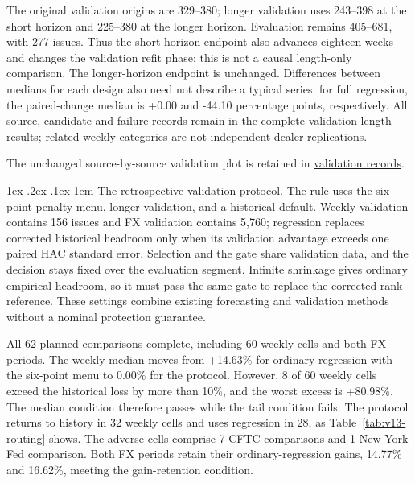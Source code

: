 \documentclass[12pt,a4paper]{article}
\makeatletter
\renewcommand\paragraph{\@startsection{paragraph}{4}{\z@}%
  {1ex \@plus .2ex \@minus .1ex}{-1em}%
  {\normalfont\normalsize\bfseries}}
\makeatother
\begin{document}
The original validation origins are 329--380; longer validation uses 243--398 at the short horizon and 225--380 at the longer horizon. Evaluation remains 405--681, with 277 issues. Thus the short-horizon endpoint also advances eighteen weeks and changes the validation refit phase; this is not a causal length-only comparison. The longer-horizon endpoint is unchanged. Differences between medians for each design also need not describe a typical series: for full regression, the paired-change median is +0.00 and -44.10 percentage points, respectively. All source, candidate and failure records remain in the \href{https://github.com/ByronLi0207/financial-mathematics-paper-20261020/tree/revision-v13/results/v13/nyfed-validation}{complete validation-length results}; related weekly categories are not independent dealer replications.

The unchanged source-by-source validation plot is retained in \href{https://github.com/ByronLi0207/financial-mathematics-paper-20261020/blob/submission-final/EXTENDED_RESULTS.md#asmbi-extended-s38}{validation records}.


\FloatBarrier
\paragraph{The retrospective validation protocol.}
The rule uses the six-point penalty menu, longer validation, and a historical default. Weekly validation contains 156 issues and FX validation contains 5,760; regression replaces corrected historical headroom only when its validation advantage exceeds one paired HAC standard error. Selection and the gate share validation data, and the decision stays fixed over the evaluation segment. Infinite shrinkage gives ordinary empirical headroom, so it must pass the same gate to replace the corrected-rank reference. These settings combine existing forecasting and validation methods without a nominal protection guarantee.

All 62 planned comparisons complete, including 60 weekly cells and both FX periods. The weekly median moves from +14.63\% for ordinary regression with the six-point menu to 0.00\% for the protocol. However, 8 of 60 weekly cells exceed the historical loss by more than 10\%, and the worst excess is +80.98\%. The median condition therefore passes while the tail condition fails. The protocol returns to history in 32 weekly cells and uses regression in 28, as Table~\ref{tab:v13-routing} shows. The adverse cells comprise 7 CFTC comparisons and 1 New York Fed comparison. Both FX periods retain their ordinary-regression gains, 14.77\% and 16.62\%, meeting the gain-retention condition.
\end{document}
